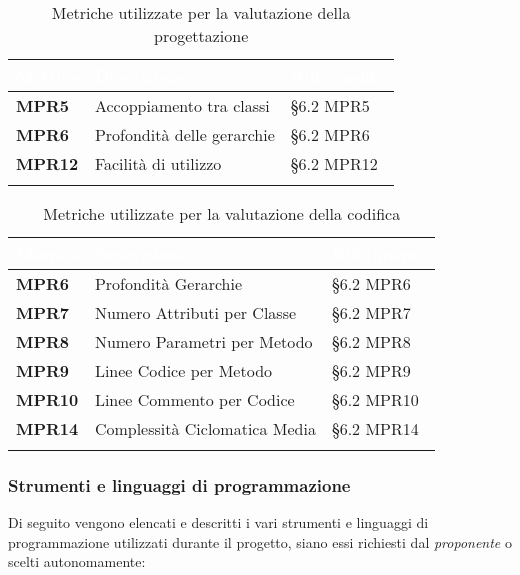 \setlength{\freewidth}{\dimexpr\textwidth-0\tabcolsep}
\renewcommand{\arraystretch}{1.5}
\setlength{\aboverulesep}{0pt}
\setlength{\belowrulesep}{0pt}
\begin{longtable}{L{.22\freewidth} L{.4\freewidth} L{.2\freewidth}}
	\toprule
	\textcolor{white}{\textbf{Metrica}}&
	\textcolor{white}{\textbf{Descrizione}}&	
	\textcolor{white}{\textbf{Riferimento}}\\	
	\toprule
	\endhead
	
	\textbf{MPR5} & Accoppiamento tra classi & \S 6.2 MPR5 \\
	\textbf{MPR6} & Profondità delle gerarchie & \S 6.2 MPR6 \\
	\textbf{MPR12} & Facilità di utilizzo & \S 6.2 MPR12 \\
	
	\bottomrule
	\caption{Metriche utilizzate per la valutazione della progettazione}
\end{longtable}

\setlength{\freewidth}{\dimexpr\textwidth-0\tabcolsep}
\renewcommand{\arraystretch}{1.5}
\setlength{\aboverulesep}{0pt}
\setlength{\belowrulesep}{0pt}
\begin{longtable}{L{.22\freewidth} L{.4\freewidth} L{.2\freewidth}}
	\toprule
	\textcolor{white}{\textbf{Metrica}}&
	\textcolor{white}{\textbf{Descrizione}}&	
	\textcolor{white}{\textbf{Riferimento}}\\
	\toprule
	\endhead

	\textbf{MPR6} & Profondità Gerarchie &  \S6.2 MPR6 \\
	\textbf{MPR7} & Numero Attributi per Classe & \S 6.2 MPR7 \\
	\textbf{MPR8} & Numero Parametri per Metodo & \S 6.2 MPR8 \\
	\textbf{MPR9} & Linee Codice per Metodo & \S 6.2 MPR9 \\
	\textbf{MPR10} & Linee Commento per Codice & \S 6.2 MPR10 \\
	\textbf{MPR14} & Complessità Ciclomatica Media & \S 6.2 MPR14 \\

	\bottomrule
	\caption{Metriche utilizzate per la valutazione della codifica}
\end{longtable}

\subsubsection{Strumenti e linguaggi di programmazione}
Di seguito vengono elencati e descritti i vari strumenti e linguaggi di programmazione utilizzati durante il progetto, siano essi richiesti dal \emph{proponente} o scelti autonomamente:
